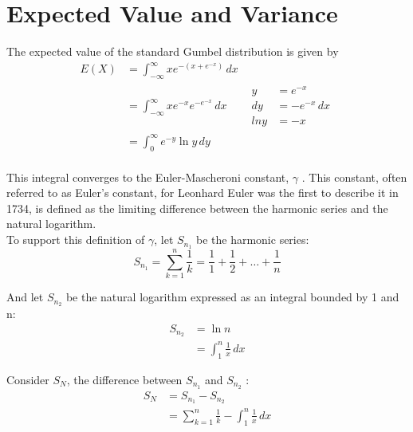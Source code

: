 \documentclass[titlepage,12 pt]{article}
\begin{document}
\section{Expected Value and Variance}

The expected value of the standard Gumbel distribution is given by
\begin{align*}
E(X)&= \int_{-\infty}^{\infty} xe^{-(x + e^{-x})} \, dx \\[3mm]
    &= \int_{-\infty}^{\infty} xe^{-x}e^{-e^{-x}} \, dx
    & \boxed{\begin{aligned}y &= e^{-x} \\
             dy &= -e^{-x} \, dx \\
             lny &= -x \end{aligned}} \\[3 mm]
    &= \int_{0}^{\infty} e^{-y} \ln{y} \, dy \\[3mm]
\end{align*}

This integral converges to the Euler-Mascheroni constant, $\gamma$ . This constant, often referred to as Euler's constant, for Leonhard Euler was the first to describe it in 1734, is defined as the limiting difference between the harmonic series and the natural logarithm.
\\ 
To support this definition of $\gamma$, let $S_{n_1}$ be the harmonic series:
\begin{equation*}
 S_{n_1} = \sum_{k=1}^{n} \frac{1}{k} = \frac{1}{1} + \frac{1}{2} + \dots + \frac{1}{n}   
\end{equation*}



And let $S_{n_2}$ be the natural logarithm expressed as an integral bounded by 1 and n:
\begin{align*}
S_{n_2} & = \ln{n} \\[3 mm]
              &= \int_{1}^{n} \frac{1}{x} \,dx
\end{align*}
              
Consider $S_N$, the difference between $S_{n_1}$ and $S_{n_2}$ :
\begin{align*}
    S_{N}& = S_{n_1} - S_{n_2}
    \\[2 mm] 
    &= \sum_{k=1}^{n} \frac{1}{k} -\int_{1}^{n} \frac{1}{x} \,dx 
\end{align*}
\end{document}
